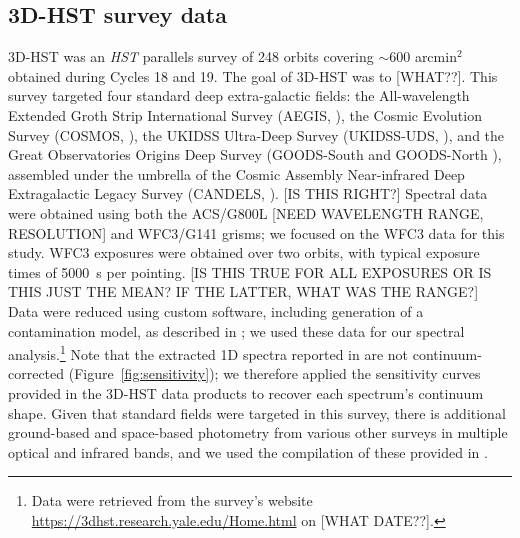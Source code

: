 \documentclass[manuscript]{aastex63}
\begin{document}

\subsection{3D-HST survey data}
 3D-HST was an {\em HST} parallels survey of 248 orbits covering $\sim$600 arcmin$^2$ obtained during Cycles 18 and 19. 
 The goal of 3D-HST was to [WHAT??].
 This survey targeted four standard deep extra-galactic fields: 
 the All-wavelength Extended Groth Strip International Survey (AEGIS, \citealt{1538-4357-660-1-L1}), 
 the Cosmic Evolution Survey (COSMOS, \citealt{Scoville2007}), 
 the UKIDSS Ultra-Deep Survey (UKIDSS-UDS, \citealt{2007MNRAS.379.1599L}), 
 and the Great Observatories Origins Deep Survey (GOODS-South and GOODS-North \citealt{Giavalisco2004}),
 assembled under the umbrella of the Cosmic Assembly Near-infrared Deep Extragalactic Legacy Survey (CANDELS, \citealt{2011ApJS..197...35G,2011ApJS..197...36K}). [IS THIS RIGHT?]
 Spectral data were obtained using both the ACS/G800L [NEED WAVELENGTH RANGE, RESOLUTION] and WFC3/G141 grisms;
 we focused on the WFC3 data for this study.
 WFC3 exposures were obtained over two orbits, with typical exposure times of 5000~s per pointing. [IS THIS TRUE FOR ALL EXPOSURES OR IS THIS JUST THE MEAN? IF THE LATTER, WHAT WAS THE RANGE?]
Data were reduced using custom software, including generation of a contamination model, as described in \citet{Momcheva2016};
we used these data for our spectral analysis.\footnote{Data were retrieved from the survey's website \url{https://3dhst.research.yale.edu/Home.html} on [WHAT DATE??].}
Note that the extracted 1D spectra reported in \citet{Momcheva2016} are not continuum-corrected (Figure~\ref{fig:sensitivity}); we therefore applied the sensitivity curves provided in the 3D-HST data products to recover each spectrum's continuum shape.
Given that standard fields were targeted in this survey, there is additional ground-based and space-based photometry 
from various other surveys in multiple optical and infrared bands, and we used the compilation of these provided in \cite{Skelton2014}.
\end{document}
